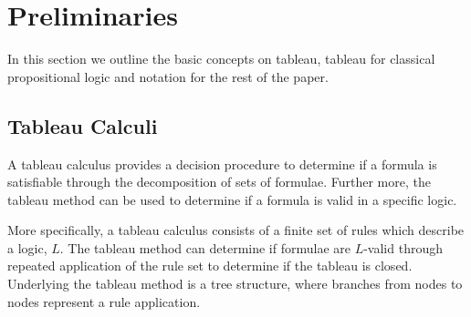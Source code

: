 \documentclass{llncs}
\begin{document}
\section{Preliminaries}

In this section we outline the basic concepts on tableau, tableau for classical
propositional logic and notation for the rest of the paper.

\subsection{Tableau Calculi}

A tableau calculus provides a decision procedure to determine if a formula
is satisfiable through the decomposition of sets of formulae. Further more,
the tableau method can be used to determine if a formula is valid in a specific
logic.

More specifically, a tableau calculus consists of a finite set of rules which
describe a logic, $L$. The tableau method can determine if formulae
are $L$-valid through repeated application of the rule set to
determine if the tableau is closed. Underlying the tableau method is a tree
structure, where branches from nodes to nodes represent a rule application.
\end{document}
